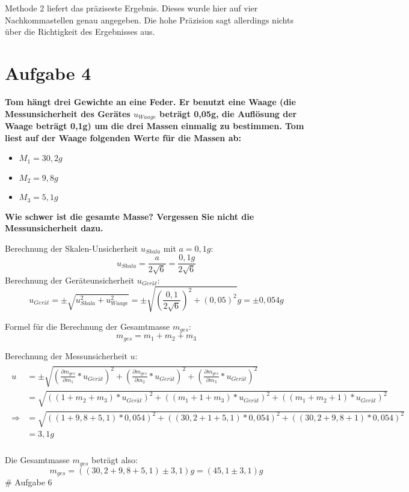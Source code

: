\documentclass[
]{article}
\providecommand{\tightlist}{%
  \setlength{\itemsep}{0pt}\setlength{\parskip}{0pt}}
\begin{document}
Methode 2 liefert das präziseste Ergebnis. Dieses wurde hier auf vier
Nachkommastellen genau angegeben. Die hohe Präzision sagt allerdings
nichts über die Richtigkeit des Ergebnisses aus.

\hypertarget{aufgabe-4}{%
\section{Aufgabe 4}\label{aufgabe-4}}

\textbf{Tom hängt drei Gewichte an eine Feder. Er benutzt eine Waage
(die Messunsicherheit des Gerätes \(u_{Waage}\) beträgt 0,05g, die
Auflösung der Waage beträgt 0,1g) um die drei Massen einmalig zu
bestimmen. Tom liest auf der Waage folgenden Werte für die Massen ab:}

\begin{itemize}
\tightlist
\item
  \(M_1= 30,2 g\)
\item
  \(M_2= 9,8 g\)
\item
  \(M_3= 5,1 g\)
\end{itemize}

\textbf{Wie schwer ist die gesamte Masse? Vergessen Sie nicht die
Messunsicherheit dazu.}

Berechnung der Skalen-Unsicherheit \(u_{Skala}\) mit \(a=0,1g\):
\[u_{Skala} = \frac{a}{2\sqrt{6}} = \frac{0,1g}{2\sqrt{6}}\] Berechnung
der Geräteunsicherheit \(u_{Gerät}\):
\[u_{Gerät} =\pm \sqrt{u_{Skala}^2+u_{Waage}^2} =\pm \sqrt{(\frac{0,1}{2\sqrt{6}})^2+(0,05)^2}g = \pm 0,054g\]

Formel für die Berechnung der Gesamtmasse \(m_{ges}\):
\[m_{ges} = m_1+m_2+m_3\]

Berechnung der Messunsicherheit \(u\): \begin{align*}
\begin{split}
u&=\pm \sqrt{(\frac{\partial m_{ges}}{\partial m_1}*u_{Gerät})^2+(\frac{\partial m_{ges}}{\partial m_2}*u_{Gerät})^2+(\frac{\partial m_{ges}}{\partial m_3}*u_{Gerät})^2}\\
 &= \sqrt{((1+m_2+m_3)*u_{Gerät})^2+((m_1+1+m_3)*u_{Gerät})^2+((m_1+m_2+1)*u_{Gerät})^2}\\
\Rightarrow &= \sqrt{((1+9,8+5,1)*0,054)^2+((30,2+1+5,1)*0,054)^2+((30,2+9,8+1)*0,054)^2}\\
&= 3,1g\\
\end{split}
\end{align*}

Die Gesamtmasse \(m_{ges}\) beträgt also:
\[m_{ges}=((30,2+9,8+5,1)\pm 3,1)g = (45,1 \pm 3,1)g\] \# Aufgabe 6
\end{document}
